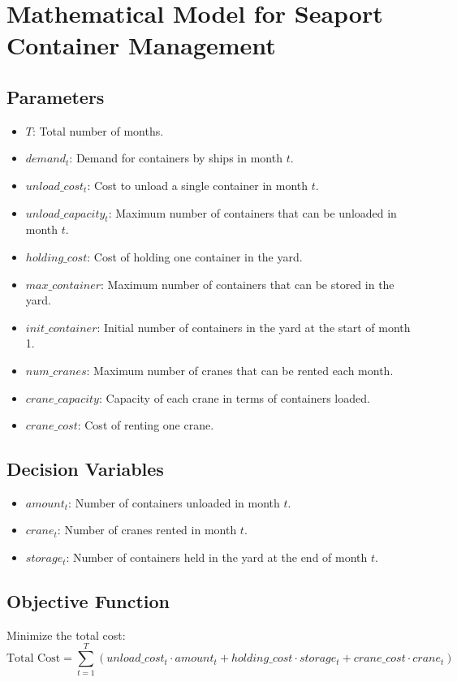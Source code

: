 \documentclass{article}
\begin{document}
\section*{Mathematical Model for Seaport Container Management}

\subsection*{Parameters}
\begin{itemize}
    \item $T$: Total number of months.
    \item $demand_t$: Demand for containers by ships in month $t$.
    \item $unload\_cost_t$: Cost to unload a single container in month $t$.
    \item $unload\_capacity_t$: Maximum number of containers that can be unloaded in month $t$.
    \item $holding\_cost$: Cost of holding one container in the yard.
    \item $max\_container$: Maximum number of containers that can be stored in the yard.
    \item $init\_container$: Initial number of containers in the yard at the start of month 1.
    \item $num\_cranes$: Maximum number of cranes that can be rented each month.
    \item $crane\_capacity$: Capacity of each crane in terms of containers loaded.
    \item $crane\_cost$: Cost of renting one crane.
\end{itemize}

\subsection*{Decision Variables}
\begin{itemize}
    \item $amount_t$: Number of containers unloaded in month $t$.
    \item $crane_t$: Number of cranes rented in month $t$.
    \item $storage_t$: Number of containers held in the yard at the end of month $t$.
\end{itemize}

\subsection*{Objective Function}
Minimize the total cost:
\[
\text{Total Cost} = \sum_{t=1}^{T} \left( unload\_cost_t \cdot amount_t + holding\_cost \cdot storage_t + crane\_cost \cdot crane_t \right)
\]
\end{document}
